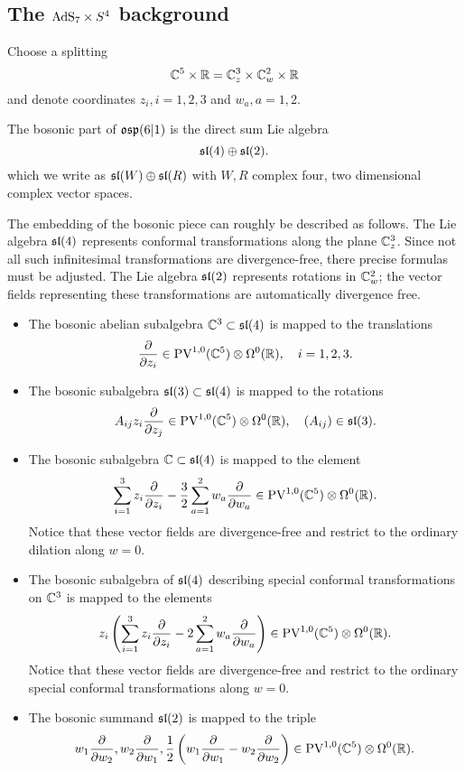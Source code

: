 \documentclass[11pt]{amsart}
\begin{document}
\subsection{The ${\rm AdS}_7 \times S^4$ background}

\parsec[]

Choose a splitting 
\[
\mathbb C^5 \times \mathbb R = \mathbb C_z^3 \times \mathbb C_w^2 \times \mathbb R
\]
and denote coordinates $z_i, i=1,2,3$ and $w_a, a=1,2$.

The bosonic part of $\mathfrak{osp}(6|1)$ is the direct sum Lie algebra
\[
\mathfrak{sl}(4) \oplus \mathfrak{sl}(2) .
\]
which we write as $\mathfrak{sl}(W) \oplus \mathfrak{sl}(R)$ with $W,R$ complex four, two dimensional complex vector spaces. 

The embedding of the bosonic piece can roughly be described as follows. 
The Lie algebra $\mathfrak{sl}(4)$ represents conformal transformations along the plane $\mathbb C^3_z$.
Since not all such infinitesimal transformations are divergence-free, there precise formulas must be adjusted.   
The Lie algebra $\mathfrak{sl}(2)$ represents rotations in $\mathbb C^2_w$; the vector fields representing these transformations are automatically divergence free.


\begin{itemize}

\item
The bosonic abelian subalgebra $\mathbb C^3 \subset \mathfrak{sl}(4)$ is mapped to the translations 
\[
\frac{\partial}{\partial z_i} \in {\rm PV}^{1,0}(\mathbb C^5) \otimes \Omega^0(\mathbb R) , \quad i=1,2,3.
\]

\item
The bosonic subalgebra $\mathfrak{sl}(3) \subset \mathfrak{sl}(4)$ is mapped to the 
rotations
\[
A_{ij} z_i \frac{\partial}{\partial z_j} \in {\rm PV}^{1,0}(\mathbb C^5)\otimes \Omega^0(\mathbb R) , \quad (A_{ij}) \in \mathfrak{sl}(3) .
\]

\item
The bosonic subalgebra $\mathbb C \subset \mathfrak{sl}(4)$ is mapped to the element
\[
\sum_{i=1}^3 z_i \frac{\partial}{\partial z_i} - \frac32 \sum_{a=1}^2 w_a \frac{\partial}{\partial w_a} \in {\rm PV}^{1,0}(\mathbb C^5) \otimes \Omega^0(\mathbb R)  .
\] 
Notice that these vector fields are divergence-free and restrict to the ordinary dilation along $w=0$. 
\item 
The bosonic subalgebra of $\mathfrak{sl}(4)$ describing special conformal transformations on $\mathbb C^3$ is mapped to the elements 
\[
z_i \left(\sum_{i=1}^3 z_i \frac{\partial}{\partial z_i} - 2 \sum_{a=1}^2 w_a \frac{\partial}{\partial w_a} \right) \in {\rm PV}^{1,0}(\mathbb C^5) \otimes \Omega^0(\mathbb R) .
\] 
Notice that these vector fields are divergence-free and restrict to the ordinary special conformal transformations along $w=0$. 
\item 
The bosonic summand $\mathfrak{sl}(2)$ is mapped to the triple
\[
w_1 \frac{\partial}{\partial w_2}, w_2 \frac{\partial}{\partial w_1}, \frac12 \left(w_1 \frac{\partial}{\partial w_1} - w_2 \frac{\partial}{\partial w_2}\right) \in {\rm PV}^{1,0}(\mathbb C^5) \otimes \Omega^0(\mathbb R) .
\]
\end{itemize}
\end{document}
